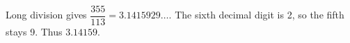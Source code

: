 Long division gives $\dfrac{355}{113}=3.1415929\ldots$. The sixth decimal digit is 2, so the fifth stays 9. Thus $\boxed{3.14159}$.
